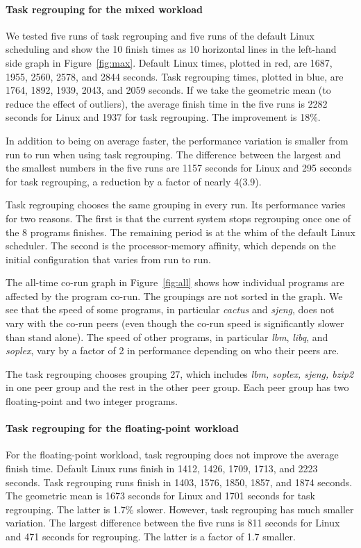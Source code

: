 \paragraph{Task regrouping for the mixed workload}
We tested five runs of task regrouping and five runs of the default
Linux scheduling and show the 10 finish times as 10 horizontal lines
in the left-hand side graph in Figure~\ref{fig:max}.  Default Linux
times, plotted in red, are 1687, 1955, 2560, 2578, and 2844 seconds.  Task
regrouping times, plotted in blue, are 1764, 1892, 1939, 2043, and
2059 seconds.  If we take the geometric mean (to reduce the effect of
outliers), the average finish time in the five runs is 2282 seconds
for Linux and 1937 for task regrouping.  The improvement is 18\%.

In addition to being on average faster, the performance variation 
is smaller from run to run when using task regrouping.  The
difference between the largest and the smallest numbers in the five 
runs are 1157 seconds for Linux and 295 seconds for task
regrouping, a reduction by a factor of nearly 4(3.9).  

Task regrouping chooses the same grouping in every run.  Its
performance varies for two reasons.  The first is that the current
system stops regrouping once one of the 8 programs finishes.  The
remaining period is at the whim of the default Linux scheduler.  The
second is the processor-memory affinity, which depends on the initial
configuration that varies from run to run.

The all-time co-run graph in Figure~\ref{fig:all} shows how
individual programs are affected by the program co-run.  The groupings
are not sorted in the graph.  We see that the speed of some programs, in
particular \emph{cactus} and \emph{sjeng}, does not vary with the co-run
peers (even though the co-run speed is significantly slower
than stand alone).  The speed of other programs, in particular \emph{lbm},
\emph{libq}, and \emph{soplex}, vary by a factor of 2 in performance
depending on who their peers are.

The task regrouping chooses grouping 27, which includes \emph{lbm,
  soplex, sjeng, bzip2} in one peer group and the rest in the other
peer group.   Each peer group has two floating-point and two integer
programs.  

\paragraph{Task regrouping for the floating-point workload}
For the floating-point workload, task regrouping does not improve the
average finish time.  Default Linux runs finish in 1412, 1426, 1709,
1713, and 2223 seconds.  Task regrouping runs finish in 1403, 1576,
1850, 1857, and 1874 seconds.  The geometric mean is 1673 seconds for
Linux and 1701 seconds for task regrouping.  The latter is 1.7\%
slower.  However, task regrouping has much smaller variation.  The
largest difference between the five runs is 811 seconds for Linux and
471 seconds for regrouping.  The latter is a factor of 1.7 smaller.

